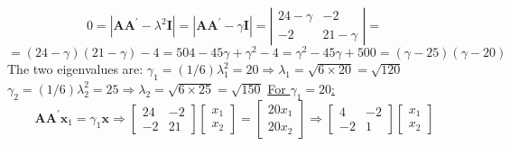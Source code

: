 \begin{enumerate}[font=\bfseries]
\begin{enumerate}
\[            \]
            \[
                0 = \left|\mathbf{A}\mathbf{A}^\prime - \lambda^2\mathbf{I}\right| = \left|\mathbf{A}\mathbf{A}^\prime - \gamma\mathbf{I}\right|
                =
                \left|
                \begin{matrix}
                    24 - \gamma & -2 \\
                    -2 & 21 - \gamma
                \end{matrix}
                \right|
                =
            \]
            \[
                =
                (24-\gamma)(21-\gamma) - 4
                =
                504-45\gamma+\gamma^2-4
                =
                \gamma^2 - 45\gamma +500
                =
                (\gamma - 25)(\gamma - 20)
            \]
            The two eigenvalues are:
            \newline
            $\gamma_1=(1/6)\lambda_1^2= 20 \Rightarrow \lambda_1 = \sqrt{6 \times 20} = \sqrt{120}$
            \newline
            $\gamma_2=(1/6)\lambda_2^2= 25 \Rightarrow \lambda_2 = \sqrt{6 \times 25} = \sqrt{150}$
            \newline
            \newline
            \underline{For $\gamma_1 = 20$:}
            \[
                \mathbf{A}\mathbf{A}^\prime\mathbf{x}_1 = \gamma_1\mathbf{x}
                \Rightarrow
                \begin{bmatrix}
                    24 & -2 \\
                    -2 & 21
                \end{bmatrix}
                \begin{bmatrix}
                    x_1 \\
                    x_2
                \end{bmatrix}
                =
                \begin{bmatrix}
                    20 x_1\\
                    20 x_2
                \end{bmatrix}
                \Rightarrow
                \begin{bmatrix}
                    4 & -2 \\
                    -2 & 1
                \end{bmatrix}
                \begin{bmatrix}
                    x_1 \\
                    x_2

\end{bmatrix}\]
\end{enumerate}
\end{enumerate}
